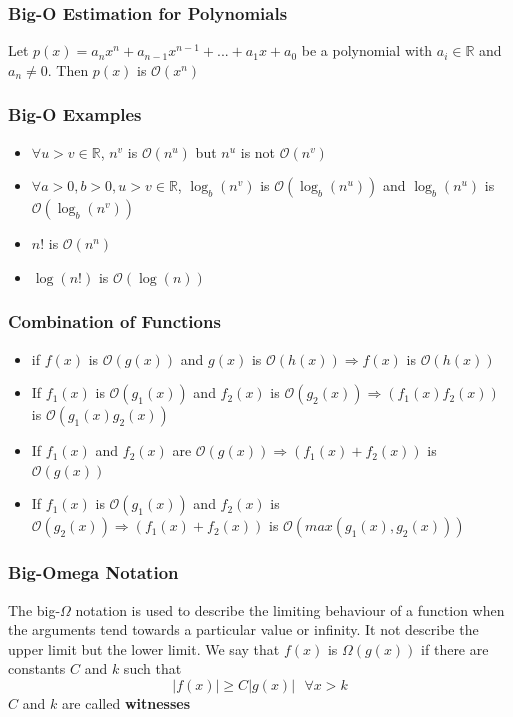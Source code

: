 \documentclass{article}
\begin{document}
\subsubsection{Big-O Estimation for Polynomials}
\begin{tcolorbox}[sharp corners, colback=green!30, colframe=green!80!blue, title=Complexity of Polynomials]
Let $ p(x) = a_{n}x^{n} + a_{n-1}x^{n-1} + ... + a_{1}x + a_0 $ be a polynomial with $ a_i \in \mathbb{R} $ and $ a_n \neq 0 $. Then $ p(x) $ is $ \mathcal{O}(x^n) $
\end{tcolorbox}

\subsubsection{Big-O Examples}
\begin{itemize}
\item $ \forall u > v \in \mathbb{R} $, $ n^v $ is $ \mathcal{O}(n^u) $ but $ n^u $ is not $ \mathcal{O}(n^v) $
\item $ \forall a > 0, b > 0, u > v \in \mathbb{R} $, $ \log_b(n^v) $ is $ \mathcal{O}(\log_b(n^u)) $ and $ \log_b(n^u) $ is $ \mathcal{O}(\log_b(n^v)) $
\item $ n! $ is $ \mathcal{O}(n^n) $
\item $ \log(n!) $ is $ \mathcal{O}(\log(n)) $
\end{itemize}

\subsubsection{Combination of Functions}
\begin{itemize}
\item if $ f(x) $ is $ \mathcal{O}(g(x)) $ and $ g(x) $ is $ \mathcal{O}(h(x)) \Rightarrow f(x) $ is $ \mathcal{O}(h(x)) $
\item If $ f_1(x) $ is $ \mathcal{O}(g_1(x)) $ and $ f_2(x) $ is $ \mathcal{O}(g_2(x)) \Rightarrow (f_1(x)f_2(x)) $ is $ \mathcal{O}(g_1(x)g_2(x)) $
\item If $ f_1(x) $ and $ f_2(x) $ are $ \mathcal{O}(g(x)) \Rightarrow (f_1(x) + f_2(x)) $ is $ \mathcal{O}(g(x)) $
\item If $ f_1(x) $ is $ \mathcal{O}(g_1(x)) $ and $ f_2(x) $ is $ \mathcal{O}(g_2(x)) \Rightarrow (f_1(x) + f_2(x)) $ is $ \mathcal{O}(max(g_1(x),g_2(x))) $
\end{itemize}

\subsubsection{Big-Omega Notation} The big-$ \Omega $ notation is used to describe the limiting behaviour of a function when the arguments tend towards a particular value or infinity. It not describe the upper limit but the lower limit. We say that $ f(x) $ is $ \Omega(g(x)) $ if there are constants $ C $ and $ k $ such that
\begin{equation}
|f(x)| \geq C|g(x)| \textit{  } \forall x > k
\end{equation}
$ C $ and $ k $ are called \textbf{witnesses}
\end{document}
